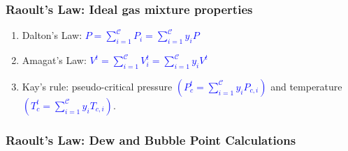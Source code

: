 \documentclass[10pt,compress,handout,ignorenonframetext,unknownkeysallowed]{beamer}
\begin{document}
\begin{frame}
  \frametitle{Raoult's Law: Ideal gas mixture properties}
  \begin{enumerate}
      \item<1-> Dalton's Law: \textcolor{blue}{$P=\sum\limits_{i=1}^{\mathcal{C}}P_{i}=\sum\limits_{i=1}^{\mathcal{C}}y_{i}P$}
      \item<2-> Amagat's Law: \textcolor{blue}{$V^{t}=\sum\limits_{i=1}^{\mathcal{C}}V_{i}^{t} = \sum\limits_{i=1}^{\mathcal{C}} y_{i}V^{t}$}
      \item<3-> Kay's rule: pseudo-critical pressure \textcolor{blue}{$\left(P_{c}^{t}=\sum\limits_{i=1}^{\mathcal{C}}y_{i}P_{c,i}\right)$} and temperature \textcolor{blue}{$\left(T_{c}^{t}=\sum\limits_{i=1}^{\mathcal{C}}y_{i}T_{c,i}\right)$}. 
  \end{enumerate}
\end{frame}

\begin{frame}
  \frametitle{Raoult's Law: Dew and Bubble Point Calculations}
         
\end{frame}
\end{document}
